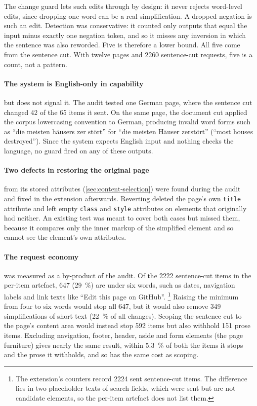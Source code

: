 The change guard lets such edits through by design: it never rejects word-level edits, since dropping one word can be a real simplification.
A dropped negation is such an edit.
Detection was conservative: it counted only outputs that equal the input minus exactly one negation token, and so it misses any inversion in which the sentence was also reworded.
Five is therefore a lower bound.
All five come from the sentence cut.
With twelve pages and \num{2260} sentence-cut requests, five is a count, not a pattern.

\paragraph{The system is English-only in capability} but does not signal it.
The audit tested one German page, where the sentence cut changed 42 of the 65 items it sent.
On the same page, the document cut applied the corpus lowercasing convention to German, producing invalid word forms such as ``die meisten häusers zer stört'' for ``die meisten Häuser zerstört'' (``most houses destroyed'').
Since the system expects English input and nothing checks the language, no guard fired on any of these outputs.

\paragraph{Two defects in restoring the original page} from its stored attributes (\cref{sec:content-selection}) were found during the audit and fixed in the extension afterwards.
Reverting deleted the page's own \texttt{title} attribute and left empty \texttt{class} and \texttt{style} attributes on elements that originally had neither.
An existing test was meant to cover both cases but missed them, because it compares only the inner markup of the simplified element and so cannot see the element's own attributes.

\paragraph{The request economy} was measured as a by-product of the audit.
Of the \num{2222} sentence-cut items in the per-item artefact, \num{647} (\qty{29}{\percent}) are under six words, such as dates, navigation labels and link texts like ``Edit this page on GitHub''.%
\footnote{The extension's counters record \num{2224} sent sentence-cut items. The difference lies in two placeholder texts of search fields, which were sent but are not candidate elements, so the per-item artefact does not list them.}
Raising the minimum from four to six words would stop all \num{647}, but it would also remove \num{349} simplifications of short text (\qty{22}{\percent} of all changes).
Scoping the sentence cut to the page's content area would instead stop \num{592} items but also withhold \num{151} prose items.
Excluding navigation, footer, header, aside and form elements (the page furniture) gives nearly the same result, within \qty{5.3}{\percent} of both the items it stops and the prose it withholds, and so has the same cost as scoping.

